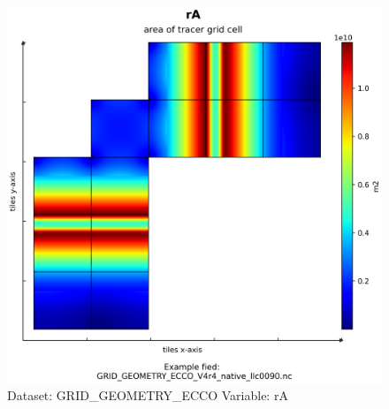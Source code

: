 \begin{figure}[H]
\centering
\includegraphics[scale=0.55]{../images/plots/native_plots_coords/Geometry_Parameters_for_the_Lat-Lon-Cap_90_(llc90)_Native_Model_Grid_(Version_4_Release_4)/rA.png}
\caption{Dataset: GRID\_GEOMETRY\_ECCO Variable: rA}
\label{tab:table-GRID_GEOMETRY_ECCO_rA-Plot}
\end{figure}
\pagebreak
